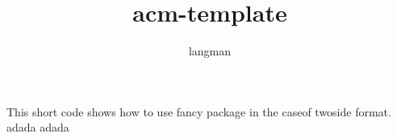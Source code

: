 \documentclass[a4paper,11pt]{article}
\author{langman}
\title{acm-template}
\begin{document}
This short code shows how to use fancy package in the caseof
twoside format.
\newpage
adada
\newpage
adada
\end{document}
